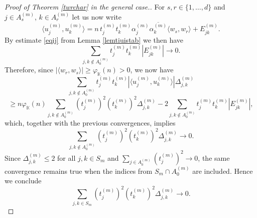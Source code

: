 \documentclass[12pt, reqno]{amsart}
\theoremstyle{definition}
\theoremstyle{remark}
\numberwithin{equation}{section}
\begin{document}
\begin{proof}[Proof of Theorem \ref{twrchar} in the general case.]
For $s, r \in \{1, \ldots, d\}$ and $j \in A_s^{(m)}$, $k \in A_r^{(m)}$ let us now write
$$\langle u_j^{(m)},u_k^{(m)}\rangle = n\,t_j^{(m)}t_k^{(m)} \alpha_j^{(m)} \overline{\alpha_k^{(m)}} \langle w_s,w_r\rangle + E_{jk}^{(m)}.$$
By estimate \eqref{eqij} from Lemma \ref{lemtiuistab} we then have
$$\sum_{j, k \notin A^{(m)}_0} t^{(m)}_jt^{(m)}_k |E_{jk}^{(m)}| \to 0.$$
Therefore, since $ |\langle w_r,w_s\rangle| \geq \varphi_{\mathbb{K}}(n) >0$, we now have
$$\sum_{j, k \notin A^{(m)}_0} t^{(m)}_jt^{(m)}_k |\langle u^{(m)}_j, u^{(m)}_k \rangle| \Delta^{(m)}_{j, k}$$
$$\geq n \varphi_{\mathbb{K}}(n) \sum_{j, k \notin A^{(m)}_0} (t_j^{(m)})^2(t_k^{(m)})^2 \Delta^{(m)}_{j, k} - 2\sum_{j, k \notin A^{(m)}_0} t^{(m)}_jt^{(m)}_k|E_{jk}^{(m)}|,$$
which, together with the previous convergences, implies
$$\sum_{j, k \notin A_0^{(m)}} (t_j^{(m)})^2(t_k^{(m)})^2 \Delta^{(m)}_{j, k} \to 0.$$
Since $\Delta^{(m)}_{j, k} \leq 2$ for all $j, k \in S_m$ and $\sum_{j \in A_0^{(m)}} (t_j^{(m)})^2 \to 0$, the same convergence remains true when the indices from $S_m \cap A_0^{(m)}$ are included. Hence we conclude
\begin{equation}
\label{eqdeltaconv}
\sum_{j, k \in S_m} (t_j^{(m)})^2(t_k^{(m)})^2 \Delta^{(m)}_{j, k} \to 0.
\end{equation}


\end{proof}
\end{document}

